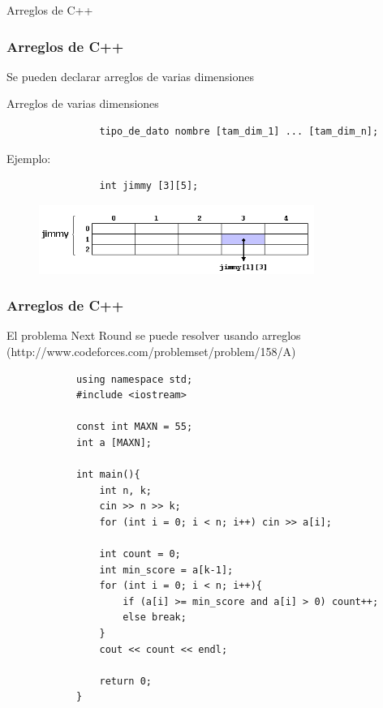 \documentclass{beamer}
\begin{document}
\begin{section}{Arreglos de C++}
	\begin{frame}[fragile]
		\frametitle{Arreglos de C++}
		Se pueden declarar arreglos de varias dimensiones
		\begin{block}{Arreglos de varias dimensiones}
			\begin{verbatim}
				tipo_de_dato nombre [tam_dim_1] ... [tam_dim_n];
			\end{verbatim}
			Ejemplo:
			\begin{verbatim}
				int jimmy [3][5];
			\end{verbatim}	
		\end{block}
		\begin{figure}
			\includegraphics[width = 0.8\textwidth]{arreglo2.png}
		\end{figure}		
	\end{frame}
	
	\begin{frame}[fragile]
		\frametitle{Arreglos de C++}
		\small{El problema Next Round se puede resolver usando arreglos (http://www.codeforces.com/problemset/problem/158/A)}
		\begin{lstlisting}
			using namespace std;
			#include <iostream>

			const int MAXN = 55;
			int a [MAXN];

			int main(){
			    int n, k;
			    cin >> n >> k;
			    for (int i = 0; i < n; i++) cin >> a[i];

			    int count = 0;
			    int min_score = a[k-1];
			    for (int i = 0; i < n; i++){
			        if (a[i] >= min_score and a[i] > 0) count++;
			        else break;
			    }
			    cout << count << endl;
			    
				return 0;
			}
		\end{lstlisting}		
	\end{frame}	
\end{section}
\end{document}
